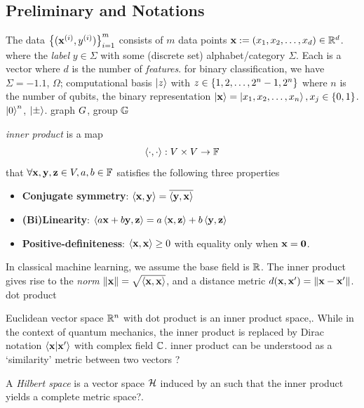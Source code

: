 \subsection{Preliminary and Notations}
The data $\qty{(\vb{x}^{(i)}, y^{(i)})}^{m}_{i=1}$ consists of $m$ data points $\vb{x}:= (x_1,x_2,\dots,x_d) \in \mathbb{R}^d$.
where the \emph{label} $y\in\Sigma$ with some (discrete set) alphabet/category $\Sigma$. 
Each is a vector where $d$ is the number of \emph{features}.
for binary classification, we have $\Sigma=\qty{-1,1}$,
$\Omega$;
computational basis $\ket{z}$ with $z\in \qty{1,2,\dots,2^n-1,2^n}$ where $n$ is the number of qubits,
the binary representation $\ket{\vb{x}}=\ket{x_1,x_2,\dots,x_n},x_j\in \qty{0,1}$.
$\ket{0}^n$, $\ket{\pm}$.
graph $G$, group $\mathbb{G}$
\begin{definition}\label{def:inner_product}
	\emph{inner product} is a map
	\begin{equation}
		\expval{\cdot,\cdot}: V \times V \to \mathbb{F}
	\end{equation}
	that $\forall \vb{x},\vb{y},\vb{z}\in V,a,b\in\mathbb{F}$
	satisfies the following three properties 
	\begin{itemize}
		\item \textbf{Conjugate symmetry}:
		$\expval{\vb{x},\vb{y}}=\overline{\expval{\vb{y},\vb{x}}}$
		\item \textbf{(Bi)Linearity}:
		$\expval{a\vb{x}+b\vb{y},\vb{z}}=a\expval{\vb{x},\vb{z}}+b\expval{\vb{y},\vb{z}}$
		\item \textbf{Positive-definiteness}:
		$\expval{\vb{x},\vb{x}}\ge 0$ with equality only when $\vb{x}=\vb{0}$.
	\end{itemize}
	In classical machine learning, we assume the base field is $\mathbb{R}$.
	The inner product gives rise to the \emph{norm} $\norm{\vb{x}}=\sqrt{\expval{\vb{x},\vb{x}}}$,
	and a distance metric $d(\vb{x},\vb{x}')=\norm{\vb{x}-\vb{x}'}$.
	dot product
\end{definition}
Euclidean vector space $\mathbb{R}^n$ with dot product is an inner product space,.
While in the context of quantum mechanics,
the inner product is replaced by 
Dirac notation $\braket{\vb{x}}{\vb{x}'}$ with complex field $\mathbb{C}$.
inner product can be understood as a `similarity' metric between two vectors ?
\begin{definition}\label{def:hilbert_space}
	A \emph{Hilbert space} is a vector space $\mathcal{H}$ induced by an 
	such that the inner product yields a complete metric space?.
\end{definition}

